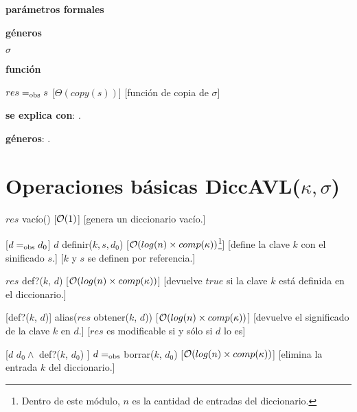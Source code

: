 \begin{Interfaz}
  \textbf{parámetros formales}\parindent\\
  \parbox{1.7cm}{\textbf{géneros}} $\sigma$\\
  \parbox[t]{1.7cm}{\textbf{función}}\parbox[t]{\textwidth-2\parindent-1.7cm}{    	
    {$res =_{\mathrm{obs}} s$}
    [$\Theta(copy(s))$]
    [función de copia de $\sigma$]
    }
      
  \textbf{se explica con}: .

  \textbf{géneros}: .

  \section*{Operaciones básicas DiccAVL($\kappa, \sigma$)}

  {$res$ \igobs vacío()}
  [$\mathcal{O}(1)$]
  [genera un diccionario vacío.]

  [$d =_{\mathrm{obs}} d_0$]  
  {$d$ \igobs definir($k, s, d_0$)}
  [$\mathcal{O}(log(n) \times comp(\kappa))$\footnote{Dentro de este módulo, $n$ es la cantidad de entradas del diccionario.}]
  [define la clave $k$ con el sinificado $s$.]
  [$k$ y $s$ se definen por referencia.]
    
  {$res$ \igobs def?($k$, $d$) }
  [$\mathcal{O}(log(n) \times comp(\kappa))$]
  [devuelve $true$ si la clave $k$ está definida en el diccionario.]
  
  [def?($k$, $d$)]  
  {alias($res$ \igobs obtener($k$, $d$))}
  [$\mathcal{O}(log(n) \times comp(\kappa))$]
  [devuelve el significado de la clave $k$ en $d$.]
  [$res$ es modificable si y sólo si $d$ lo es]
  
  [$d$ \igobs $d_0 \land$ def?($k$, $d_0$) ]
  {$d =_{\mathrm{obs}}$ borrar($k$, $d_0$)}
  [$\mathcal{O}(log(n) \times comp(\kappa))$]
  [elimina la entrada $k$ del diccionario.] 
  
\end{Interfaz}

